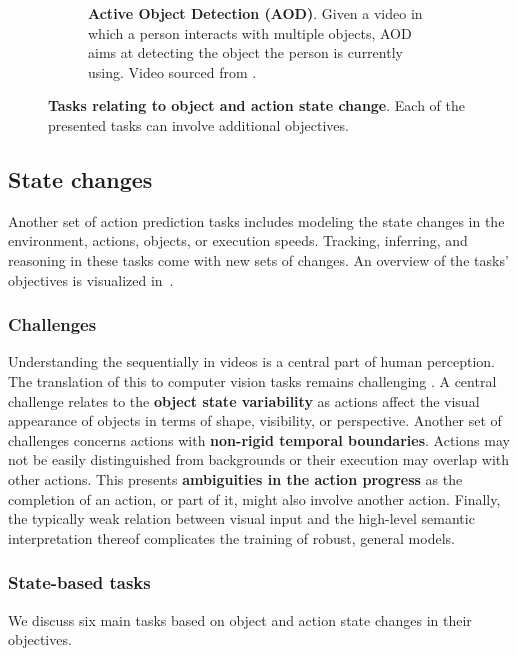 \begin{figure}[t]
\begin{subfigure}{\linewidth}
\caption{\textbf{Active Object Detection (AOD)}. Given a video in which a person interacts with multiple objects, AOD aims at detecting the object the person is currently using. Video sourced from \citep{ragusa2021meccano}.}
\label{fig:states::aod}
\end{subfigure}
\caption{\textbf{Tasks relating to object and action state change}. Each of the presented tasks can involve additional objectives.}
\label{fig:state_changes}
\end{figure}



\subsection{State changes}
\label{sec:prediction::states}

Another set of action prediction tasks includes modeling the state changes in the environment, actions, objects, or execution speeds. Tracking, inferring, and reasoning in these tasks come with new sets of changes. An overview of the tasks' objectives is visualized in~.

\subsubsection{Challenges}

Understanding the sequentially in videos is a central part of human perception. The translation of this to computer vision tasks remains challenging \citep{de2023there}. A central challenge relates to the \textbf{object state variability} as actions affect the visual appearance of objects in terms of shape, visibility, or perspective. Another set of challenges concerns actions with \textbf{non-rigid temporal boundaries}. Actions may not be easily distinguished from backgrounds or their execution may overlap with other actions. This presents \textbf{ambiguities in the action progress} as the completion of an action, or part of it, might also involve another action. Finally, the typically weak relation between visual input and the high-level semantic interpretation thereof complicates the training of robust, general models.



\subsubsection{State-based tasks}

We discuss six main tasks based on object and action state changes in their objectives.

